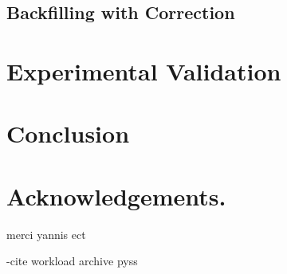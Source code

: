 \documentclass{llncs}
\begin{document}
\subsection{Backfilling with Correction}
\label{sub:backfilling_with_correction}





\section{Experimental Validation}
\label{sec:experimental_validation}





\section{Conclusion}
\label{sec:conclusion}





\section*{Acknowledgements.}
\label{sec:ack}
merci yannis ect

-cite
workload archive
pyss




\end{document}
